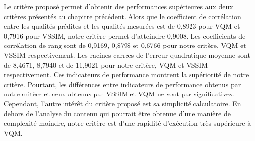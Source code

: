 Le critère proposé permet d'obtenir des performances supérieures aux deux critères présentés au chapitre précédent. Alors que le coefficient de corrélation entre les qualités prédites et les qualités mesurées est de 0,8923 pour VQM et 0,7916 pour VSSIM, notre critère permet d'atteindre 0,9008. Les coefficients de corrélation de rang sont de 0,9169, 0,8798 et 0,6766 pour notre critère, VQM et VSSIM respectivement. Les racines carrées de l'erreur quadratique moyenne sont de 8,4671, 8,7940 et de 11,9021 pour notre critère, VQM et VSSIM respectivement. Ces indicateurs de performance montrent la supériorité de notre critère. Pourtant, les différences entre indicateurs de performance obtenus par notre critère et ceux obtenus par VSSIM et VQM ne sont pas significatives. Cependant, l'autre intérêt du critère proposé est sa simplicité calculatoire. En dehors de l'analyse du contenu qui pourrait être obtenue d'une manière de complexité moindre, notre critère est d'une rapidité d'exécution très supérieure à VQM.

\ornementChapitre


